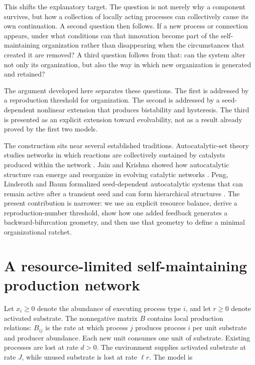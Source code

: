 \documentclass[11pt]{article}
\begin{document}
This shifts the explanatory target. The question is not merely why a component survives, but how a collection of locally acting processes can collectively cause its own continuation. A second question then follows. If a new process or connection appears, under what conditions can that innovation become part of the self-maintaining organization rather than disappearing when the circumstances that created it are removed? A third question follows from that: can the system alter not only its organization, but also the way in which new organization is generated and retained?

The argument developed here separates these questions. The first is addressed by a reproduction threshold for organization. The second is addressed by a seed-dependent nonlinear extension that produces bistability and hysteresis. The third is presented as an explicit extension toward evolvability, not as a result already proved by the first two models.

The construction sits near several established traditions. Autocatalytic-set theory studies networks in which reactions are collectively sustained by catalysts produced within the network \citep{hordijk2010,hordijk2012}. Jain and Krishna showed how autocatalytic structure can emerge and reorganize in evolving catalytic networks \citep{jain1998,jain2001}. Peng, Linderoth and Baum formalized seed-dependent autocatalytic systems that can remain active after a transient seed and can form hierarchical structures \citep{peng2022}. The present contribution is narrower: we use an explicit resource balance, derive a reproduction-number threshold, show how one added feedback generates a backward-bifurcation geometry, and then use that geometry to define a minimal organizational ratchet.

\section{A resource-limited self-maintaining production network}

Let $x_i\ge 0$ denote the abundance of executing process type $i$, and let $r\ge 0$ denote activated substrate. The nonnegative matrix $B$ contains local production relations: $B_{ij}$ is the rate at which process $j$ produces process $i$ per unit substrate and producer abundance. Each new unit consumes one unit of substrate. Existing processes are lost at rate $d>0$. The environment supplies activated substrate at rate $J$, while unused substrate is lost at rate $\ell r$. The model is
\end{document}
